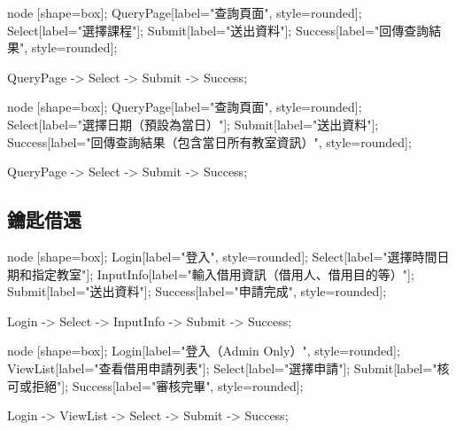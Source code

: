\documentclass{article}
\begin{document}
\pagebreak

\begin{center}

	 {
		node [shape=box];
		QueryPage[label="查詢頁面", style=rounded];
		Select[label="選擇課程"];
		Submit[label="送出資料"];
		Success[label="回傳查詢結果", style=rounded];

		QueryPage -> Select -> Submit -> Success;
	}

\end{center}

\begin{center}

	 {
		node [shape=box];
		QueryPage[label="查詢頁面", style=rounded];
		Select[label="選擇日期（預設為當日）"];
		Submit[label="送出資料"];
		Success[label="回傳查詢結果（包含當日所有教室資訊）", style=rounded];

		QueryPage -> Select -> Submit -> Success;
	}
\end{center}

\pagebreak

\subsection{鑰匙借還}

\begin{center}

	 {
		node [shape=box];
		Login[label="登入", style=rounded];
		Select[label="選擇時間日期和指定教室"];
		InputInfo[label="輸入借用資訊（借用人、借用目的等）"];
		Submit[label="送出資料"];
		Success[label="申請完成", style=rounded];

		Login -> Select -> InputInfo -> Submit -> Success;
	}
\end{center}

\begin{center}

	 {
		node [shape=box];
		Login[label="登入（Admin Only）", style=rounded];
		ViewList[label="查看借用申請列表"];
		Select[label="選擇申請"];
		Submit[label="核可或拒絕"];
		Success[label="審核完畢", style=rounded];

		Login -> ViewList -> Select -> Submit -> Success;
	}

\end{center}
\end{document}
